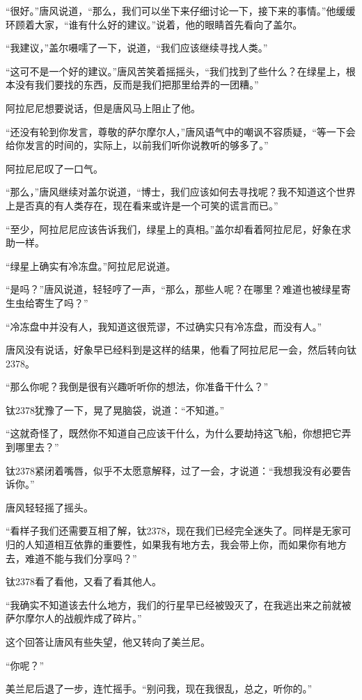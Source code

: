 “很好。”唐风说道，“那么，我们可以坐下来仔细讨论一下，接下来的事情。”他缓缓环顾着大家，“谁有什么好的建议。”说着，他的眼睛首先看向了盖尔。 

“我建议，”盖尔嗫嚅了一下，说道，“我们应该继续寻找人类。” 

“这可不是一个好的建议。”唐风苦笑着摇摇头，“我们找到了些什么？在绿星上，根本没有我们要找的东西，反而是我们把那里给弄的一团糟。” 

阿拉尼尼想要说话，但是唐风马上阻止了他。 

“还没有轮到你发言，尊敬的萨尔摩尔人，”唐风语气中的嘲讽不容质疑，“等一下会给你发言的时间的，实际上，以前我们听你说教听的够多了。” 

阿拉尼尼叹了一口气。 

“那么，”唐风继续对盖尔说道，“博士，我们应该如何去寻找呢？我不知道这个世界上是否真的有人类存在，现在看来或许是一个可笑的谎言而已。” 

“至少，阿拉尼尼应该告诉我们，绿星上的真相。”盖尔却看着阿拉尼尼，好象在求助一样。 

“绿星上确实有冷冻盘。”阿拉尼尼说道。 

“是吗？”唐风说道，轻轻哼了一声，“那么，那些人呢？在哪里？难道也被绿星寄生虫给寄生了吗？” 

“冷冻盘中并没有人，我知道这很荒谬，不过确实只有冷冻盘，而没有人。” 

唐风没有说话，好象早已经料到是这样的结果，他看了阿拉尼尼一会，然后转向钛2378。 

“那么你呢？我倒是很有兴趣听听你的想法，你准备干什么？” 

钛2378犹豫了一下，晃了晃脑袋，说道：“不知道。” 

“这就奇怪了，既然你不知道自己应该干什么，为什么要劫持这飞船，你想把它弄到哪里去？” 

钛2378紧闭着嘴唇，似乎不太愿意解释，过了一会，才说道：“我想我没有必要告诉你。” 

唐风轻轻摇了摇头。 

“看样子我们还需要互相了解，钛2378，现在我们已经完全迷失了。同样是无家可归的人知道相互依靠的重要性，如果我有地方去，我会带上你，而如果你有地方去，难道不能与我们分享吗？” 

钛2378看了看他，又看了看其他人。 

“我确实不知道该去什么地方，我们的行星早已经被毁灭了，在我逃出来之前就被萨尔摩尔人的战舰炸成了碎片。” 

这个回答让唐风有些失望，他又转向了美兰尼。 

“你呢？” 

美兰尼后退了一步，连忙摇手。“别问我，现在我很乱，总之，听你的。” 

